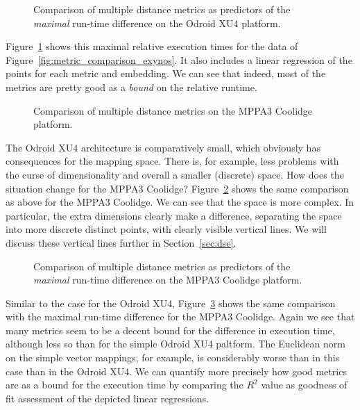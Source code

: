 \begin{figure}[h]
	\centering
	\caption{Comparison of multiple distance metrics as predictors of the \emph{maximal} run-time difference on the Odroid XU4 platform.}
	\label{fig:metric_comparison_max_exynos}
\end{figure}

Figure~\ref{fig:metric_comparison_max_exynos} shows this maximal relative execution times for the data of Figure~\ref{fig:metric_comparison_exynos}. 
It also includes a linear regression of the points for each metric and embedding.
We can see that indeed, most of the metrics are pretty good as a \emph{bound} on the relative runtime.

\begin{figure}[h]
	\centering
	\caption{Comparison of multiple distance metrics on the MPPA3 Coolidge platform.}
	\label{fig:metric_comparison_coolidge}
\end{figure}

The Odroid XU4 architecture is comparatively small, which obviously has consequences for the mapping space.
There is, for example, less problems with the curse of dimensionality and overall a smaller (discrete) space.
How does the situation change for the MPPA3 Coolidge?
Figure~\ref{fig:metric_comparison_coolidge} shows the same comparison as above for the MPPA3 Coolidge. 
We can see that the space is more complex.
In particular, the extra dimensions clearly make a difference, separating the space into more discrete distinct points, with clearly visible vertical lines.
We will discuss these vertical lines further in Section~\ref{sec:dse}.

\begin{figure}[h]
	\centering
	\caption{Comparison of multiple distance metrics as predictors of the \emph{maximal} run-time difference on the MPPA3 Coolidge platform.}
	\label{fig:metric_comparison_max_coolidge}
\end{figure}

Similar to the case for the Odroid XU4, Figure~\ref{fig:metric_comparison_max_coolidge} shows the same comparison with the maximal run-time difference for the MPPA3 Coolidge.
Again we see that many metrics seem to be a decent bound for the difference in execution time, although less so than for the simple Odroid XU4 paltform.
The Euclidean norm on the simple vector mappings, for example, is considerably worse than in this case than in the Odroid XU4.
We can quantify more precisely how good metrics are as a bound for the execution time by comparing the $R^2$ value as goodness of fit assessment of the depicted linear regressions.

